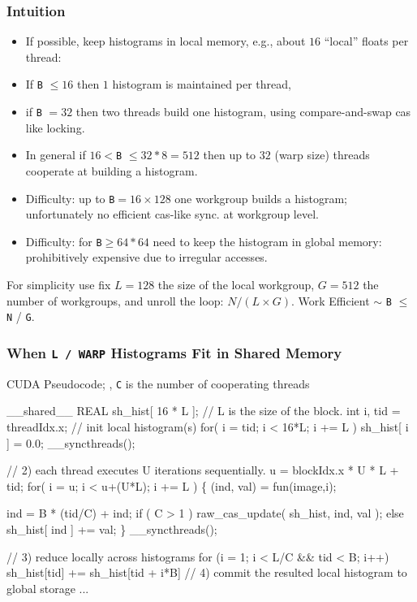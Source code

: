 \documentclass{beamer}
\renewcommand{\emph}[1]{\textcolor{structure}{#1}}
\newcommand{\emp}[1]{\textcolor{DikuRed}{ #1}}
\begin{document}
\begin{frame}[fragile,t]
  \frametitle{Intuition}
  
\begin{itemize}
    \item If possible, keep histograms in local memory, 
            e.g., about $16$ ``local'' floats per thread:\bigskip
    \item If {\tt B} $\leq 16$ then $1$ histogram is maintained per thread,
    \item if {\tt B} $= 32$ then two threads build one histogram,
            using compare-and-swap {\sc cas} like locking.\bigskip
    \item In general if $16 <${\tt B} $\leq 32*8 = 512$ then up to $32$ (warp size)
            threads cooperate at building a histogram.\bigskip
    \item \emp{Difficulty:} up to {\tt B}$=16\times128$ one workgroup 
            builds a histogram; unfortunately no efficient 
            {\sc cas}-like sync. at workgroup level.\bigskip
    \item \emp{Difficulty:} for {\tt B}$\geq 64*64$ need to keep the 
            histogram in global memory: prohibitively expensive
            due to irregular accesses.
\end{itemize}   


For simplicity use fix $L = 128$ the size of the local workgroup,
$G = 512$ the number of workgroups, and unroll the loop: $N / (L\times G)$.
Work Efficient $\sim$ {\tt B} $ \leq $ {\tt N} / {\tt G}.
  
\end{frame}


\begin{frame}[fragile,t]
  \frametitle{ When {\tt L / WARP} Histograms Fit in Shared Memory }

\begin{block}{ CUDA Pseudocode; {\tt }, {\tt C} is the number of cooperating threads}
\begin{colorcode}[fontsize=\scriptsize]
\emph{__shared__ REAL sh_hist[ 16 * L ];} // L is the size of the block.
int i, tid = threadIdx.x;
// \emp{init local histogram(s)}
for( i = tid; i < 16*L; i += L ) sh_hist[ i ] = 0.0;  
__syncthreads();

// \emp{2) each thread executes U iterations sequentially.}
u = blockIdx.x * U * L + tid; 
for( i = u; i < u+(U*L); i += L ) \{
    (ind, val) = fun(image,i);

    \alert{ind = B * (tid/C) + ind;}  
    if ( C > 1 )
         \emph{raw_cas_update( sh_hist, ind, val );}
    else \emph{sh_hist[ ind ] += val;}
\}  __syncthreads();

// \emp{3) reduce locally across histograms}
\alert{for (i = 1; i < L/C && tid < B; i++)}
  \alert{sh_hist[tid] += sh_hist[tid + i*B]}
// \emp{4) commit the resulted local histogram to global storage } ...
\end{colorcode}
\end{block} 
\end{frame}
\end{document}
